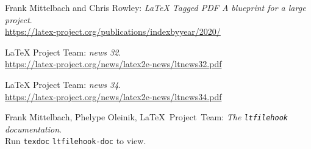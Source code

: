 \documentclass{ltnews}
\providecommand\Dash {\unskip \textemdash}
\begin{document}
\medskip

\begin{thebibliography}{9}

\fontsize{9.3}{11.3}\selectfont

 Frank Mittelbach and Chris Rowley:
  \emph{\LaTeX{} Tagged PDF \Dash A blueprint for a large project}.\\
  \url{https://latex-project.org/publications/indexbyyear/2020/}



 \LaTeX{} Project Team:
  \emph{\LaTeXe{} news 32}.\\
  \url{https://latex-project.org/news/latex2e-news/ltnews32.pdf}


 \LaTeX{} Project Team:
  \emph{\LaTeXe{} news 34}.\\
  \url{https://latex-project.org/news/latex2e-news/ltnews34.pdf}

 Frank Mittelbach, Phelype Oleinik, \LaTeX{}~Project~Team:
  \emph{The \texttt{\upshape ltfilehook} documentation}.\\
  Run \texttt{texdoc} \texttt{ltfilehook-doc} to view.
\end{thebibliography}
\end{document}
